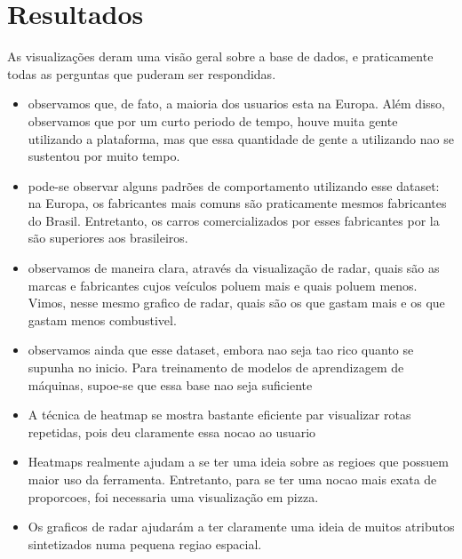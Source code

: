 \documentclass[10pt, conference]{IEEEtran}
\begin{document}




\section{Resultados}
%

As visualizações deram uma visão geral sobre a base de dados, e praticamente todas
as perguntas que puderam ser respondidas. 

\begin{itemize}
  
  \item observamos que, de fato, a maioria dos usuarios esta na Europa. Além disso, observamos
    que por um curto periodo de tempo, houve muita gente utilizando a plataforma, mas que essa
    quantidade de gente a utilizando nao se sustentou por muito tempo.

  \item pode-se observar alguns padrões de comportamento utilizando esse dataset: na Europa, os
    fabricantes mais comuns são praticamente mesmos fabricantes do Brasil. Entretanto, os carros
    comercializados por esses fabricantes por la são superiores aos brasileiros.

  \item observamos de maneira clara, através da visualização de radar, quais são as marcas
  e fabricantes cujos veículos poluem mais e quais poluem menos. Vimos, nesse mesmo grafico de radar,  
  quais são os que gastam mais e os que gastam menos combustivel.

  \item observamos ainda que esse dataset, embora nao seja tao rico quanto se supunha no inicio. Para
  treinamento de modelos de aprendizagem de máquinas, supoe-se que essa base nao seja suficiente

  \item A técnica de heatmap se mostra bastante eficiente par visualizar rotas repetidas, pois deu
  claramente essa nocao ao usuario

  \item Heatmaps realmente ajudam a se ter uma ideia sobre as regioes que possuem maior uso da ferramenta.
  Entretanto, para se ter uma nocao mais exata de proporcoes, foi necessaria uma visualização em pizza.

  \item Os graficos de radar ajudarám a ter claramente uma ideia de muitos atributos sintetizados numa
  pequena regiao espacial.

\end{itemize}
\end{document}
